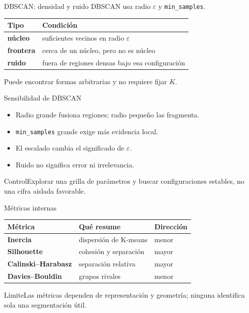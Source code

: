 \documentclass[aspectratio=169,10pt]{beamer}
\begin{document}
\begin{frame}{DBSCAN: densidad y ruido}\small
DBSCAN usa radio $\varepsilon$ y \texttt{min\_samples}.
\begin{tabularx}{\textwidth}{>{\bfseries}p{}X}\toprule Tipo & Condición\\\midrule núcleo & suficientes vecinos en radio $\varepsilon$\\ frontera & cerca de un núcleo, pero no es núcleo\\ ruido & fuera de regiones densas bajo esa configuración\\\bottomrule\end{tabularx}
Puede encontrar formas arbitrarias y no requiere fijar $K$.
\end{frame}

\begin{frame}{Sensibilidad de DBSCAN}\small
\begin{itemize}\item Radio grande fusiona regiones; radio pequeño las fragmenta.\item \texttt{min\_samples} grande exige más evidencia local.\item El escalado cambia el significado de $\varepsilon$.\item Ruido no significa error ni irrelevancia.\end{itemize}
\begin{block}{Control}Explorar una grilla de parámetros y buscar configuraciones estables, no una cifra aislada favorable.\end{block}
\end{frame}

\begin{frame}{Métricas internas}\small
\begin{tabularx}{\textwidth}{>{\bfseries}p{}XX}\toprule Métrica & Qué resume & Dirección\\\midrule Inercia & dispersión de K-means & menor\\ Silhouette & cohesión y separación & mayor\\ Calinski--Harabasz & separación relativa & mayor\\ Davies--Bouldin & grupos rivales & menor\\\bottomrule\end{tabularx}
\begin{alertblock}{Límite}Las métricas dependen de representación y geometría; ninguna identifica sola una segmentación útil.\end{alertblock}
\end{frame}
\end{document}
